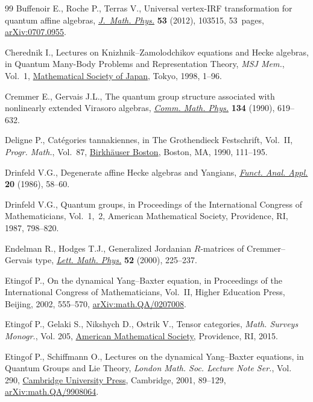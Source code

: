 \documentclass[10pt,a4paper]{article}
\numberwithin{equation}{section}
\begin{document}
\begin{thebibliography}{99}
Buffenoir E., Roche P., Terras V., Universal vertex-{IRF} transformation for
 quantum affine algebras, \href{https://doi.org/10.1063/1.4754699}{\textit{J.~Math. Phys.}} \textbf{53} (2012), 103515,
 53~pages, \href{https://arxiv.org/abs/0707.0955}{arXiv:0707.0955}.

Cherednik I., Lectures on {K}nizhnik--{Z}amolodchikov equations and {H}ecke
 algebras, in Quantum {M}any-{B}ody {P}roblems and {R}epresentation {T}heory,
 \textit{MSJ Mem.}, Vol.~1, \href{https://doi.org/10.2969/msjmemoirs/00101C010}{Mathematical Society of Japan}, Tokyo, 1998, 1--96.

Cremmer E., Gervais J.L., The quantum group structure associated with
 nonlinearly extended {V}irasoro algebras, \href{https://doi.org/10.1007/BF02098449}{\textit{Comm. Math. Phys.}}
 \textbf{134} (1990), 619--632.

Deligne P., Cat\'egories tannakiennes, in The {G}rothendieck {F}estschrift,
 {V}ol.~{II}, \textit{Progr. Math.}, Vol.~87, \href{https://doi.org/10.1007/978-0-8176-4575-5_3}{Birkh\"auser Boston}, Boston, MA,
 1990, 111--195.

Drinfeld V.G., Degenerate affine {H}ecke algebras and {Y}angians,
 \href{https://doi.org/10.1007/BF01077318}{\textit{Funct. Anal. Appl.}} \textbf{20} (1986), 58--60.

Drinfeld V.G., Quantum groups, in Proceedings of the {I}nternational {C}ongress
 of {M}athematicians, {V}ol.~1,~2, American Mathematical Society, Providence,
 RI, 1987, 798--820.

Endelman R., Hodges T.J., Generalized {J}ordanian {$R$}-matrices of
 {C}remmer--{G}ervais type, \href{https://doi.org/10.1023/A:1007693603336}{\textit{Lett. Math. Phys.}} \textbf{52} (2000),
 225--237.

Etingof P., On the dynamical {Y}ang--{B}axter equation, in Proceedings of the
 {I}nternational {C}ongress of {M}athematicians, {V}ol.~{II}, Higher Education
 Press, Beijing, 2002, 555--570, \href{https://arxiv.org/abs/math.QA/0207008}{arXiv:math.QA/0207008}.

Etingof P., Gelaki S., Nikshych D., Ostrik V., Tensor categories, \textit{Math.
 Surveys Monogr.}, Vol. 205, \href{https://doi.org/10.1090/surv/205}{American Mathematical Society}, Providence, RI,
 2015.

Etingof P., Schiffmann O., Lectures on the dynamical {Y}ang--{B}axter
 equations, in Quantum {G}roups and {L}ie {T}heory, \textit{London Math. Soc.
 Lecture Note Ser.}, Vol. 290, \href{https://doi.org/10.1017/CBO9780511542848.007}{Cambridge University Press}, Cambridge, 2001,
 89--129, \href{https://arxiv.org/abs/math.QA/9908064}{arXiv:math.QA/9908064}.


\end{thebibliography}
\end{document}
